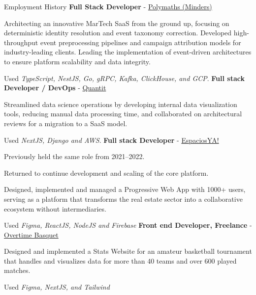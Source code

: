 \begin{rubric}{Employment History}
\entry*[2/2026 - Present]%
    \textbf{Full Stack Developer} - {\href{https://minders.io/}{Polymaths (Minders)}}\par
Architecting an innovative MarTech SaaS from the ground up, focusing on deterministic identity resolution and event taxonomy correction. Developed high-throughput event preprocessing pipelines and campaign attribution models for industry-leading clients. Leading the implementation of event-driven architectures to ensure platform scalability and data integrity.\par
Used \emph{TypeScript, NestJS, Go, gRPC, Kafka, ClickHouse, and GCP}.
\entry*[5/2025 - 7/2025]%
	\textbf{Full stack Developer / DevOps} - {\href{https://bequantit.com/home/}{Quantit}}\par
    Streamlined data science operations by developing internal data visualization tools, reducing manual data processing time, and collaborated on architectural reviews for a migration to a SaaS model.\par
    Used \emph{NextJS, Django and AWS}.
\entry*[2023 - 2025]%
	\textbf{Full stack Developer} - {\href{http://www.espaciosya.com}{EspaciosYA!}}\par
    Previously held the same role from 2021--2022.\par
    Returned to continue development and scaling of the core platform.\par
	Designed, implemented and managed a Progressive Web App with 1000+ users, serving as a platform that transforms the real estate sector into a collaborative ecosystem without intermediaries.\par
    Used \emph{Figma, ReactJS, NodeJS and Firebase}
\entry*[2022 - 2023]%
	\textbf{Front end Developer, Freelance} - {\href{http://www.overtimebasquet.com}{Overtime Basquet}}\par
    Designed and implemented a Stats Website for an amateur basketball tournament that handles and visualizes data for more than 40 teams and over 600 played matches.\par
    Used \emph{Figma, NextJS, and Tailwind}
\end{rubric}
